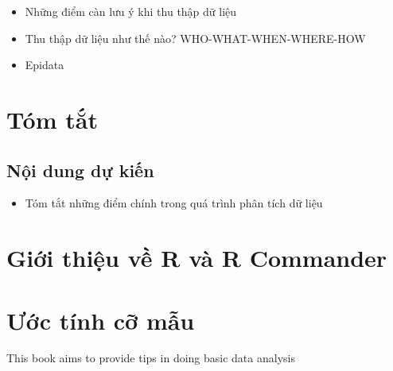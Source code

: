 \documentclass[]{tufte-book}
\providecommand{\tightlist}{%
  \setlength{\itemsep}{0pt}\setlength{\parskip}{0pt}}
\begin{document}
\begin{itemize}
\tightlist
\item
  Những điểm càn lưu ý khi thu thập dữ liệu
\item
  Thu thập dữ liệu như thế nào? WHO-WHAT-WHEN-WHERE-HOW
\item
  Epidata
\end{itemize}

\hypertarget{tom-tt}{%
\chapter{Tóm tắt}\label{tom-tt}}

\hypertarget{ni-dung-d-kin-6}{%
\section{Nội dung dự kiến}\label{ni-dung-d-kin-6}}

\begin{itemize}
\tightlist
\item
  Tóm tắt những điểm chính trong quá trình phân tích dữ liệu
\end{itemize}

\hypertarget{Rcmdr}{%
\chapter{Giới thiệu về R và R Commander}\label{Rcmdr}}

\hypertarget{uc-tinh-c-mu}{%
\chapter*{Ước tính cỡ mẫu}\label{uc-tinh-c-mu}}

This book aims to provide tips in doing basic data analysis


\end{document}
